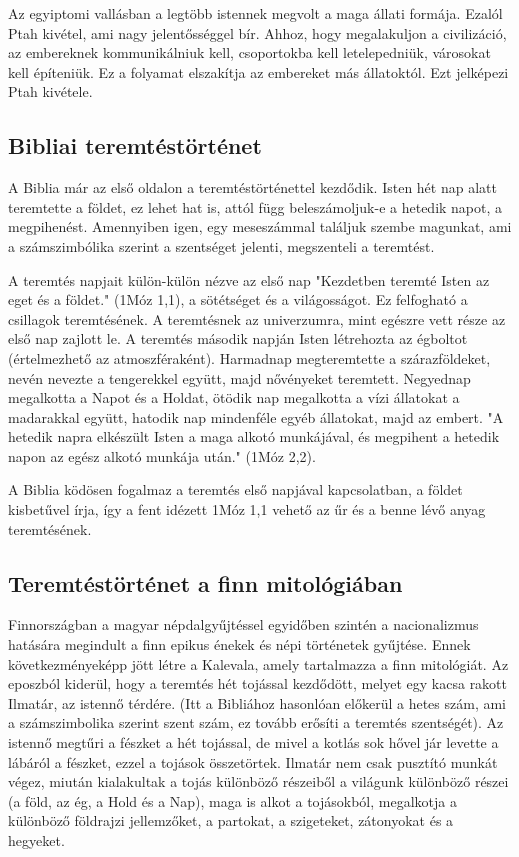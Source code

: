 \documentclass[a4paper]{article}
\begin{document}
{
\footnotesize
    Az egyiptomi vallásban a legtöbb istennek megvolt a maga állati formája. Ezalól Ptah kivétel, ami nagy jelentősséggel bír. Ahhoz, hogy megalakuljon a civilizáció, az embereknek kommunikálniuk kell, csoportokba kell letelepedniük, városokat kell építeniük. Ez a folyamat elszakítja az embereket más állatoktól. Ezt jelképezi Ptah kivétele. \cite{egyiptomiteologiak}
}

\subsection*{Bibliai teremtéstörténet}
A Biblia már az első oldalon a teremtéstörténettel kezdődik. Isten hét nap alatt teremtette a földet, ez lehet hat is, attól függ beleszámoljuk-e a hetedik napot, a megpihenést. Amennyiben igen, egy meseszámmal találjuk szembe magunkat, ami a számszimbólika szerint a szentséget jelenti, megszenteli a teremtést.
\par
A teremtés napjait külön-külön nézve az első nap "Kezdetben teremté Isten az eget és a földet." (1Móz 1,1), a sötétséget és a világosságot. Ez felfogható a csillagok teremtésének. A teremtésnek az univerzumra, mint egészre vett része az első nap zajlott le. A teremtés második napján Isten létrehozta az égboltot (értelmezhető az atmoszféraként). Harmadnap megteremtette a szárazföldeket, nevén nevezte a tengerekkel együtt, majd nővényeket teremtett. Negyednap megalkotta a Napot és a Holdat, ötödik nap megalkotta a vízi állatokat a madarakkal együtt, hatodik nap mindenféle egyéb állatokat, majd az embert. "A hetedik napra elkészült Isten a maga alkotó munkájával, és megpihent a hetedik napon az egész alkotó munkája után." (1Móz 2,2). \cite{biblia}
\par
{
    \footnotesize
    A Biblia ködösen fogalmaz a teremtés első napjával kapcsolatban, a földet kisbetűvel írja, így a fent idézett 1Móz 1,1 vehető az űr és a benne lévő anyag teremtésének.
}

\subsection*{Teremtéstörténet a finn mitológiában}
Finnországban a magyar népdalgyűjtéssel egyidőben szintén a nacionalizmus hatására megindult a finn epikus énekek és népi történetek gyűjtése. Ennek következményeképp jött létre a Kalevala, amely tartalmazza a finn mitológiát. Az eposzból kiderül, hogy a teremtés hét tojással kezdődött, melyet egy kacsa rakott Ilmatár, az istennő térdére. (Itt a Bibliához hasonlóan előkerül a hetes szám, ami a számszimbolika szerint szent szám, ez tovább erősíti a teremtés szentségét). Az istennő megtűri a fészket a hét tojással, de mivel a kotlás sok hővel jár levette a lábáról a fészket, ezzel a tojások összetörtek. Ilmatár nem csak pusztító munkát végez, miután kialakultak a tojás különböző részeiből a világunk különböző részei (a föld, az ég, a Hold és a Nap), maga is alkot a tojásokból, megalkotja a különböző földrajzi jellemzőket, a partokat, a szigeteket, zátonyokat és a hegyeket. \cite{kalevala}
\end{document}

